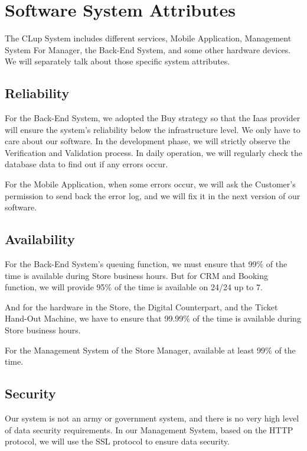 \documentclass[a4paper,12pt]{report}
\begin{document}
\section{Software System Attributes}

The CLup System includes different services, Mobile Application, Management System For Manager, the Back-End System, and some other hardware devices. We will separately talk about those specific system attributes. 

\subsection{Reliability} 

For the Back-End System, we adopted the Buy strategy so that the Iaas provider will ensure the system's reliability below the infrastructure level. We only have to care about our software. In the development phase, we will strictly observe the Verification and Validation process. In daily operation, we will regularly check the database data to find out if any errors occur. 

For the Mobile Application, when some errors occur, we will ask the Customer's permission to send back the error log, and we will fix it in the next version of our software.

\subsection{Availability}

For the Back-End System's queuing function, we must ensure that 99\% of the time is available during Store business hours.  But for CRM and Booking function, we will provide 95\% of the time is available on 24/24 up to 7.

And for the hardware in the Store, the Digital Counterpart, and the Ticket Hand-Out Machine, we have to ensure that 99.99\% of the time is available during Store business hours.

For the Management System of the Store Manager, available at least 99\% of the time.


\subsection{Security} 

Our system is not an army or government system, and there is no very high level of data security requirements. In our Management System,  based on the HTTP protocol, we will use the SSL protocol to ensure data security.
\end{document}
